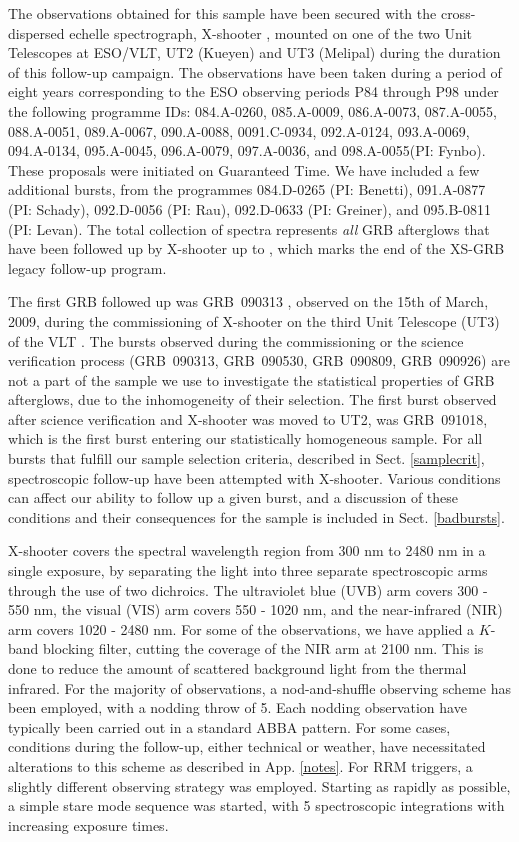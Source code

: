 \documentclass{aa}    %
\begin{document}
The observations obtained for this sample have been secured with the
cross-dispersed echelle spectrograph, X-shooter \citep{Vernet2011}, mounted on
one of the two Unit Telescopes at ESO/VLT, UT2 (Kueyen) and UT3 (Melipal) during
the duration of this follow-up campaign. The observations have been taken during
a period of eight years corresponding to the ESO observing periods P84 through P98
under the following programme IDs: 084.A-0260, 085.A-0009, 086.A-0073,
087.A-0055, 088.A-0051, 089.A-0067, 090.A-0088, 0091.C-0934, 092.A-0124,
093.A-0069, 094.A-0134, 095.A-0045, 096.A-0079, 097.A-0036, and 098.A-0055(PI:
Fynbo). These proposals were initiated on Guaranteed Time. We have included a
few additional bursts, from the programmes 084.D-0265 (PI: Benetti), 091.A-0877
(PI: Schady), 092.D-0056 (PI: Rau), 092.D-0633 (PI: Greiner), and 095.B-0811
(PI: Levan). The total collection of spectra represents \textit{all} GRB
afterglows that have been followed up by X-shooter up to \termdate, which marks
the end of the XS-GRB legacy follow-up program.

The first GRB followed up was GRB~090313 \citep{DeUgartePostigo2010}, observed
on the 15th of March, 2009, during the commissioning of X-shooter on the third
Unit Telescope (UT3) of the VLT . The bursts observed during the commissioning
or the science verification process (GRB~090313, GRB~090530, GRB~090809,
GRB~090926) are not a part of the sample we use to investigate the statistical
properties of GRB afterglows, due to the inhomogeneity of their selection. The
first burst observed after science verification and X-shooter was moved to UT2,
was GRB~091018, which is the first burst entering our statistically homogeneous
sample. For all bursts that fulfill our sample selection criteria, described in
Sect. \ref{samplecrit}, spectroscopic follow-up have been attempted with
X-shooter. Various conditions can affect our ability to follow up a given burst,
and a discussion of these conditions and their consequences for the sample is
included in Sect. \ref{badbursts}.

X-shooter covers the spectral wavelength region from 300 nm to 2480 nm in a
single exposure, by separating the light into three separate spectroscopic arms
through the use of two dichroics. The ultraviolet blue (UVB) arm covers 300 -
550 nm, the visual (VIS) arm covers 550 - 1020 nm, and the near-infrared (NIR)
arm covers 1020 - 2480 nm. For some of the observations, we have applied a
$K$-band blocking filter, cutting the coverage of the NIR arm at 2100 nm. This
is done to reduce the amount of scattered background light from the thermal
infrared. For the majority of observations, a nod-and-shuffle observing scheme
has been employed, with a nodding throw of 5\arcsec. Each nodding observation
have typically been carried out in a standard ABBA pattern. For some cases,
conditions during the follow-up, either technical or weather, have necessitated
alterations to this scheme as described in App. \ref{notes}. For RRM triggers, a
slightly different observing strategy was employed. Starting as rapidly as
possible, a simple stare mode sequence was started, with 5 spectroscopic
integrations with increasing exposure times. 
\end{document}

